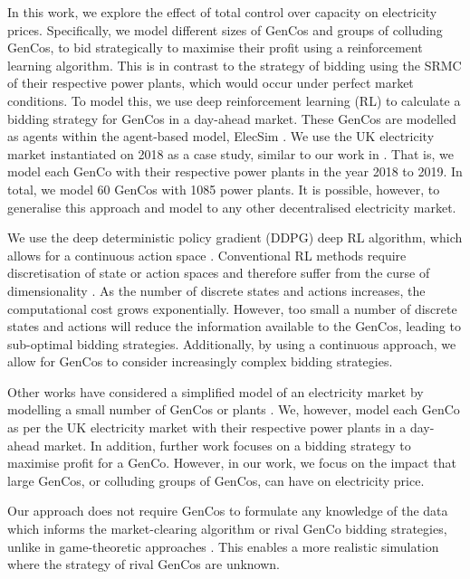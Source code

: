 In this work, we explore the effect of total control over capacity on electricity prices. Specifically, we model different sizes of GenCos and groups of colluding GenCos, to bid strategically to maximise their profit using a reinforcement learning algorithm. This is in contrast to the strategy of bidding using the SRMC of their respective power plants, which would occur under perfect market conditions. To model this, we use deep reinforcement learning (RL) to calculate a bidding strategy for GenCos in a day-ahead market. These GenCos are modelled as agents within the agent-based model, ElecSim \cite{Kell, Kell2020}. We use the UK electricity market instantiated on 2018 as a case study, similar to our work in \cite{Kell2019a}. That is, we model each GenCo with their respective power plants in the year 2018 to 2019. In total, we model 60 GenCos with 1085 power plants. It is possible, however, to generalise this approach and model to any other decentralised electricity market. 

We use the deep deterministic policy gradient (DDPG) deep RL algorithm, which allows for a continuous action space \cite{Hunt2016a}. Conventional RL methods require discretisation of state or action spaces and therefore suffer from the curse of dimensionality \cite{Ye2020a}. As the number of discrete states and actions increases, the computational cost grows exponentially. However, too small a number of discrete states and actions will reduce the information available to the GenCos, leading to sub-optimal bidding strategies. Additionally, by using a continuous approach, we allow for GenCos to consider increasingly complex bidding strategies. 

Other works have considered a simplified model of an electricity market by modelling a small number of GenCos or plants \cite{EsmaeiliAliabadi2017,Tellidou2007}. We, however, model each GenCo as per the UK electricity market with their respective power plants in a day-ahead market. In addition, further work focuses on a bidding strategy to maximise profit for a GenCo. However, in our work, we focus on the impact that large GenCos, or colluding groups of GenCos, can have on electricity price.


Our approach does not require GenCos to formulate any knowledge of the data which informs the market-clearing algorithm or rival GenCo bidding strategies, unlike in game-theoretic approaches \cite{Wang2011}. This enables a more realistic simulation where the strategy of rival GenCos are unknown.





